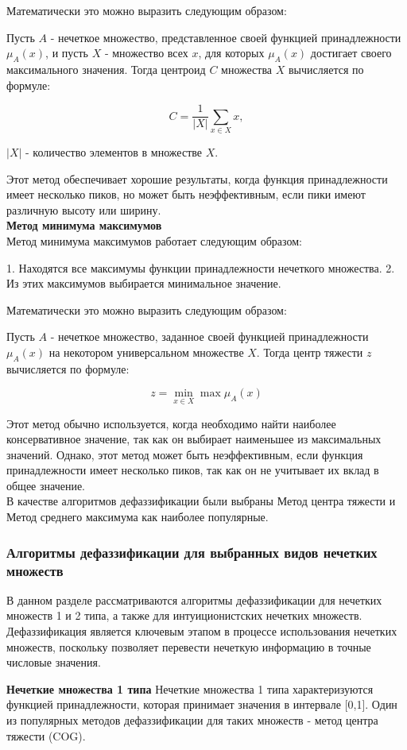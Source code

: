 \documentclass{article}
\begin{document}
    Математически это можно выразить следующим образом:

    Пусть $A$ - нечеткое множество, представленное своей функцией принадлежности $μ_A(x)$, и пусть $X$ - множество всех $x$, для которых $μ_A(x)$ достигает своего максимального значения. Тогда центроид $C$ множества $X$ вычисляется по формуле:

    $$C = \frac{1}{|X|} \sum_{x \in X} x,$$

    $|X|$ - количество элементов в множестве $X$.

    Этот метод обеспечивает хорошие результаты, когда функция принадлежности имеет несколько пиков, но может быть неэффективным, если пики имеют различную высоту или ширину.
    ~\\
    \textbf{Метод минимума максимумов}\\
    Метод минимума максимумов работает следующим образом:

    1. Находятся все максимумы функции принадлежности нечеткого множества.
    2. Из этих максимумов выбирается минимальное значение.

    Математически это можно выразить следующим образом:

    Пусть $A$ - нечеткое множество, заданное своей функцией принадлежности $\mu_A(x)$ на некотором универсальном множестве $X$. Тогда центр тяжести $z$ вычисляется по формуле:

    $$z = \min_{x \in X} \max \mu_A(x)$$

    Этот метод обычно используется, когда необходимо найти наиболее консервативное значение, так как он выбирает наименьшее из максимальных значений. Однако, этот метод может быть неэффективным, если функция принадлежности имеет несколько пиков, так как он не учитывает их вклад в общее значение.
    ~\\
    В качестве алгоритмов дефаззификации были выбраны Метод центра тяжести и Метод среднего максимума как наиболее популярные.
    \subsubsection{Алгоритмы дефаззификации для выбранных видов нечетких множеств}
    В данном разделе рассматриваются алгоритмы дефаззификации для нечетких множеств 1 и 2 типа, а также для интуиционистских нечетких множеств. Дефаззификация является ключевым этапом в процессе использования нечетких множеств, поскольку позволяет перевести нечеткую информацию в точные числовые значения.

    \textbf{Нечеткие множества 1 типа}
    Нечеткие множества 1 типа характеризуются функцией принадлежности, которая принимает значения в интервале [0,1]. Один из популярных методов дефаззификации для таких множеств - метод центра тяжести (COG).
\end{document}
